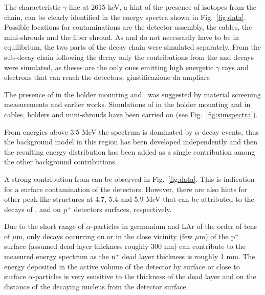  The characteristic $\gamma$ line at 2615 keV, a hint of the presence of isotopes from the  chain, can be clearly identified in the energy spectra shown in Fig.~\ref{fig:data}. Possible locations for contaminations are the detector assembly, the cables, the mini-shrouds and the fiber shroud. As  and  do not necessarily have to be in equilibrium, the two parts of the decay chain were simulated separately. From the sub-decay chain following the  decay only the contributions from the  and  decays were simulated, as theses are the only ones emitting high energetic $\gamma$ rays and electrons that can reach the detectors. {\color{red}giustificazione da ampliare}

 The presence of  in the holder mounting and  was suggested by material screening measurements and earlier works. Simulations of  in the holder mounting and  in cables, holders and mini-shrouds have been carried on (see Fig.~\ref{fig:simspectra}).

 From energies above 3.5 MeV the spectrum is dominated by $\alpha$-decay events, thus the background model in this region has been developed independently and then the resulting energy distribution has been added as a single contribution among the other background contributions.

A strong contribution from  can be observed in Fig.~\ref{fig:data}. This is indication for a surface contamination of the detectors. However, there are also hints for other peak like structures at 4.7, 5.4 and 5.9 MeV that can be attributed to the decays of ,  and  on p$^+$ detectors surfaces, respectively.

Due to the short range of $\alpha$-particles in germanium and LAr of the order of tens of $\mu$m, only decays occurring on or in the close vicinity (few $\mu$m) of the p$^+$ surface (assumed dead layer thickness roughly 300 nm) can contribute to the measured energy spectrum as the n$^+$ dead layer thickness is roughly 1 mm. The energy deposited in the active volume of the detector by surface or close to surface $\alpha$-particles is very sensitive to the thickness of the dead layer and on the distance of the decaying nucleus from the detector surface.

